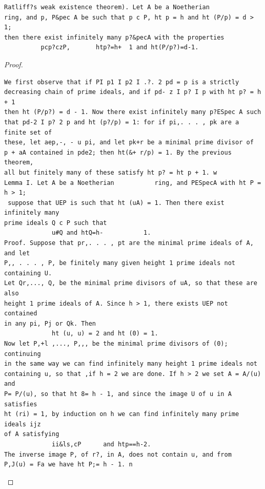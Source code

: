 \begin{theorem}\label{mcrt-auto-theorem-32-2}\uses{}
\begin{verbatim}
Ratliff?s weak existence theorem). Let A be a Noetherian
ring, and p, P&pec A be such that p c P, ht p = h and ht (P/p) = d > 1;
then there exist infinitely many p?&pecA with the properties
          pcp?czP,       htp?=h+  1 and ht(P/p?)=d-1.
\end{verbatim}
\end{theorem}
\begin{proof}
\begin{verbatim}
We first observe that if PI p1 I p2 I .?. 2 pd = p is a strictly
decreasing chain of prime ideals, and if pd- z I p? I p with ht p? = h + 1
then ht (P/p?) = d - 1. Now there exist infinitely many p?ESpec A such
that pd-2 I p? 2 p and ht (p?/p) = 1: for if pi,. . . , pk are a finite set of
these, let aep,-, - u pi, and let pk+r be a minimal prime divisor of
p + aA contained in pde2; then ht(&+ r/p) = 1. By the previous theorem,
all but finitely many of these satisfy ht p? = ht p + 1. w
Lemma I. Let A be a Noetherian           ring, and PESpecA with ht P = h > 1;
 suppose that UEP is such that ht (uA) = 1. Then there exist infinitely many
prime ideals Q c P such that
             u#Q and htQ=h-           1.
Proof. Suppose that pr,. . . , pt are the minimal prime ideals of A, and let
P,, . . . , P, be finitely many given height 1 prime ideals not containing U.
Let Qr,..., Q, be the minimal prime divisors of uA, so that these are also
height 1 prime ideals of A. Since h > 1, there exists UEP not contained
in any pi, Pj or Qk. Then
             ht (u, u) = 2 and ht (0) = 1.
Now let P,+l ,..., P,,, be the minimal prime divisors of (0); continuing
in the same way we can find infinitely many height 1 prime ideals not
containing u, so that ,if h = 2 we are done. If h > 2 we set A = A/(u) and
P= P/(u), so that ht 8= h - 1, and since the image U of u in A satisfies
ht (ri) = 1, by induction on h we can find infinitely many prime ideals ijz
of A satisfying
             ii&ls,cP      and htp==h-2.
The inverse image P, of r?, in A, does not contain u, and from
P,J(u) = Fa we have ht P;= h - 1. n
\end{verbatim}
\end{proof}


